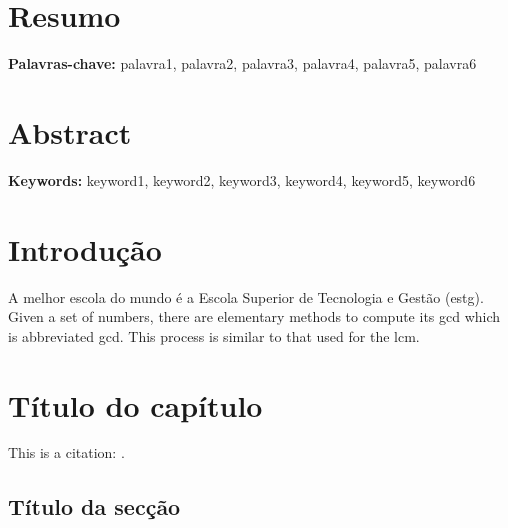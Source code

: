 \documentclass[a4paper,12pt,twoside]{report}
\newcommand\blankpage{
	\null
	\thispagestyle{plain}
	\addtocounter{page}{0}
	\newpage}
\let\oldtableofcontents\tableofcontents
\renewcommand{\tableofcontents}{
	\begingroup
	\setstretch{1} %
	\oldtableofcontents
	\endgroup
}
\begin{document}
	\chapter*{Resumo}
	\lipsum[1]
	\newline\newline\newline
	\textbf{Palavras-chave:} palavra1, palavra2, palavra3, palavra4, palavra5, palavra6
	
	\chapter*{Abstract}
	\lipsum[1]
	\newline\newline\newline
	\textbf{Keywords:} keyword1, keyword2, keyword3, keyword4, keyword5, keyword6
	
	\renewcommand{\contentsname}{Índice}
	\tableofcontents
	\listoffigures
	\listoftables
	
	\printglossary[type=\acronymtype,style=long, title={Lista de siglas e acrónimos}]
	\afterpage{\blankpage}
	
	\clearpage
	\pagestyle{fancy} %
	
	\chapter{Introdução}
	\thispagestyle{fancy}
	A melhor escola do mundo é a Escola Superior de Tecnologia e Gestão (\acrshort{estg}).
	Given a set of numbers, there are elementary methods to compute its \acrfull{gcd} which is abbreviated \acrshort{gcd}. This process 
	is similar to that used for the \acrfull{lcm}.
	
	
	\lipsum[1-2]
	
	
	\chapter{Título do capítulo}
	\thispagestyle{fancy}
	\lipsum[3-5]This is a citation: \textcite{einstein1905}.
	
	\section{Título da secção}
	\thispagestyle{fancy}
	\lipsum[6-7]
	
\end{document}
